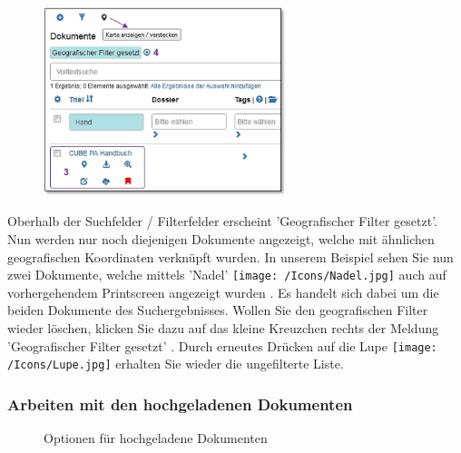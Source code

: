 \begin{figure}
  \vspace{-25pt} 
  \begin{center}
    \includegraphics[height=55mm]{../chapters/11_Dokumentenablage/pictures/11-2-3_GeoBereichResult.jpg}
  \end{center}
  \vspace{-20pt}
  \vspace{-10pt}
\end{figure}
Oberhalb der Suchfelder / Filterfelder erscheint 'Geografischer Filter gesetzt'. Nun werden nur noch diejenigen Dokumente angezeigt, welche mit ähnlichen geografischen Koordinaten verknüpft wurden. In unserem Beispiel sehen Sie nun zwei Dokumente, welche mittels 'Nadel' \texttt{[image: /Icons/Nadel.jpg]} auch auf vorhergehendem Printscreen angezeigt wurden . Es handelt sich dabei um die beiden Dokumente des Suchergebnisses. Wollen Sie den geografischen Filter wieder löschen, klicken Sie dazu auf das kleine Kreuzchen rechts der Meldung 'Geografischer Filter gesetzt' . Durch erneutes Drücken auf die Lupe \texttt{[image: /Icons/Lupe.jpg]} erhalten Sie wieder die ungefilterte Liste.

\vspace{-8pt}
\subsubsection{Arbeiten mit den hochgeladenen Dokumenten}
\label{bkm:Ref442801819}

\begin{figure}[H]
  \vspace{-10pt}
  \vspace{-15pt}
\caption{Optionen für hochgeladene Dokumenten}
\end{figure}


